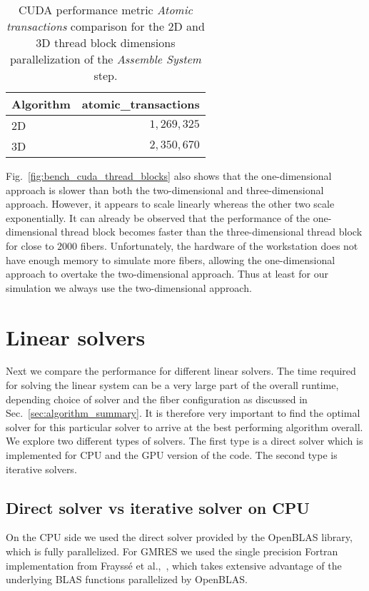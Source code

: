 \begin{table}[!htbp]
  \begin{center}
    \begin{tabulary}{0.7\textwidth}{LR}
      \toprule
      Algorithm & atomic\_transactions \\
      \midrule
      2D & $1,269,325$ \\
      3D & $2,350,670$ \\
      \bottomrule
    \end{tabulary}
  \end{center}
  \caption[Atomic transactions of 2D vs. 3D thread block dimensions.]{CUDA performance metric \emph{Atomic transactions} comparison for the 2D and 3D thread block dimensions parallelization of the \emph{Assemble System} step.}
  \label{tab:atomic_transactions}
\end{table}

Fig.~\ref{fig:bench_cuda_thread_blocks} also shows that the one-dimensional approach is slower than both the two-dimensional and three-dimensional approach. However, it appears to scale linearly whereas the other two scale exponentially. It can already be observed that the performance of the one-dimensional thread block becomes faster than the three-dimensional thread block for close to $2000$ fibers. Unfortunately, the hardware of the workstation does not have enough memory to simulate more fibers, allowing the one-dimensional approach to overtake the two-dimensional approach. Thus at least for our simulation we always use the two-dimensional approach.

\section{Linear solvers}
\label{sec:bench_linear_solvers}

Next we compare the performance for different linear solvers. The time required for solving the linear system can be a very large part of the overall runtime, depending choice of solver and the fiber configuration as discussed in Sec.~\ref{sec:algorithm_summary}. It is therefore very important to find the optimal solver for this particular solver to arrive at the best performing algorithm overall. We explore two different types of solvers. The first type is a direct solver which is implemented for CPU and the GPU version of the code. The second type is iterative solvers. 

\subsection{Direct solver vs iterative solver on CPU}
On the CPU side we used the direct solver provided by the OpenBLAS library, which is fully parallelized. For GMRES we used the single precision Fortran implementation from Frayssé et al.,~\cite{Fraysse2003}, which takes extensive advantage of the underlying BLAS functions parallelized by OpenBLAS. 

